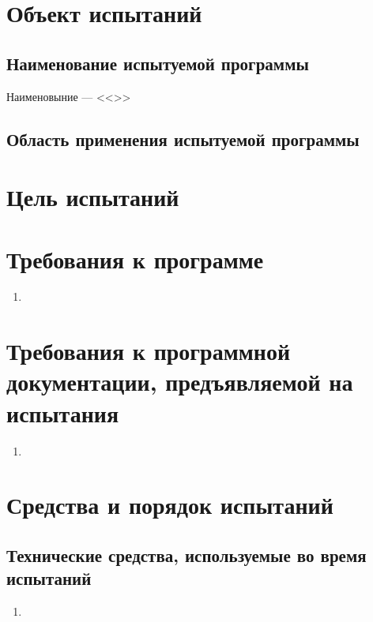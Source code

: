 \documentclass[allcolors=black]{article}
\begin{document}
\makeTitlePage

\tableofcontents

    \section{Объект испытаний}
    \subsection{Наименование испытуемой программы}
    Наименовыние --- <<>>
    
    \subsection{Область применения испытуемой программы}
    
    \section{Цель испытаний}
    
    \section{Требования к программе}
    \begin{enumerate}
        \item {}
    \end{enumerate}


    \section{Требования к программной документации, предъявляемой на испытания}
    \begin{enumerate}
        \item {}
    \end{enumerate}

    \section{Средства и порядок испытаний}
    \subsection{Технические средства, используемые во время испытаний}
    \begin{enumerate}
        \item {}
    \end{enumerate}
\end{document}
